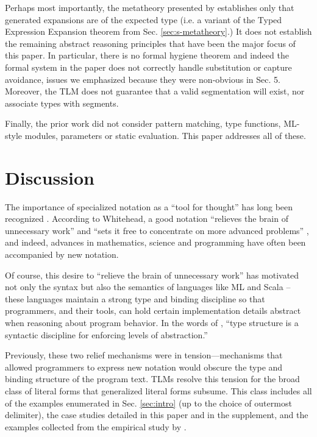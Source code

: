 \documentclass[acmsmall,review,anonymous]{acmart}\settopmatter{printfolios=true,printccs=false,printacmref=false}
\begin{document}
Perhaps most importantly, the metatheory presented by \citet{TSLs} establishes only that generated expansions are of the expected type (i.e. a variant of the Typed Expression Expansion theorem from Sec. \ref{sec:s-metatheory}.) It does not establish the remaining abstract reasoning principles that have been the major focus of this paper. In particular, there is no formal hygiene theorem and indeed the formal system in the paper does not correctly handle substitution or capture avoidance, issues we emphasized because they were non-obvious in Sec. 5. Moreover, the TLM does not guarantee that a valid segmentation will exist, nor associate types with segments. 

Finally, the prior work did not consider pattern matching, type functions, ML-style modules, parameters or static evaluation. This paper addresses all of these.


\newcommand{\discussionSec}{Discussion}
\section{\protect\discussionSec}
\label{sec:discussion}
\label{sec:conclusion}

The importance of specialized notation as a ``tool for thought'' has long been recognized \cite{DBLP:journals/cacm/Iverson80}. According to Whitehead, a good notation ``relieves the brain of unnecessary work'' and ``sets it free to concentrate on more advanced problems'' \cite{cajori1928history}, and indeed, advances in mathematics, science and programming have often been accompanied by new notation. 

Of course, this desire to ``relieve the brain of unnecessary work'' has motivated not only the syntax but also the semantics of languages like ML and Scala -- these languages maintain a strong type and binding discipline so that programmers, and their tools, can hold certain implementation details abstract when reasoning about program behavior.  In the words of \citet{B304}, ``type structure is a syntactic discipline for enforcing levels of abstraction.''

Previously, these two relief mechanisms were in tension---mechanisms  that allowed programmers to express new notation would obscure the type and binding structure of the program text. TLMs resolve this tension for the broad class of literal forms that generalized literal forms subsume. This class includes all of the examples enumerated in Sec. \ref{sec:intro} (up to the choice of outermost delimiter), the case studies detailed in this paper and in the supplement, and the examples collected from the empirical study by \citet{TSLs}.
\end{document}
